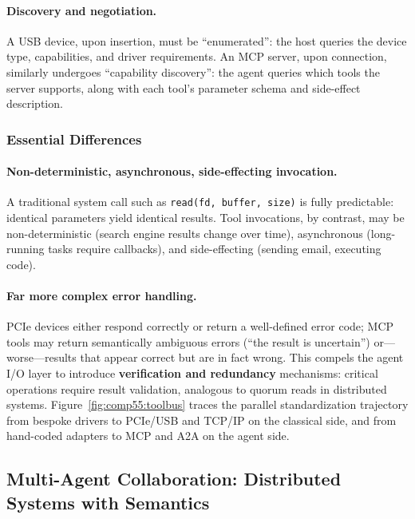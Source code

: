\paragraph{Discovery and negotiation.}
A USB device, upon insertion, must be ``enumerated'': the host queries the device type, capabilities, and driver requirements.
An MCP server, upon connection, similarly undergoes ``capability discovery'': the agent queries which tools the server supports, along with each tool's parameter schema and side-effect description.

\subsubsection{Essential Differences}

\paragraph{Non-deterministic, asynchronous, side-effecting invocation.}
A traditional system call such as \texttt{read(fd, buffer, size)} is fully predictable: identical parameters yield identical results.
Tool invocations, by contrast, may be non-deterministic (search engine results change over time), asynchronous (long-running tasks require callbacks), and side-effecting (sending email, executing code).

\paragraph{Far more complex error handling.}
PCIe devices either respond correctly or return a well-defined error code; MCP tools may return semantically ambiguous errors (``the result is uncertain'') or---worse---results that appear correct but are in fact wrong.
This compels the agent I/O layer to introduce \textbf{verification and redundancy} mechanisms: critical operations require result validation, analogous to quorum reads in distributed systems.
Figure~\ref{fig:comp55:toolbus} traces the parallel standardization trajectory from bespoke drivers to PCIe/USB and TCP/IP on the classical side, and from hand-coded adapters to MCP and A2A on the agent side.



\subsection{Multi-Agent Collaboration: Distributed Systems with Semantics}
\label{sec:distributed}

